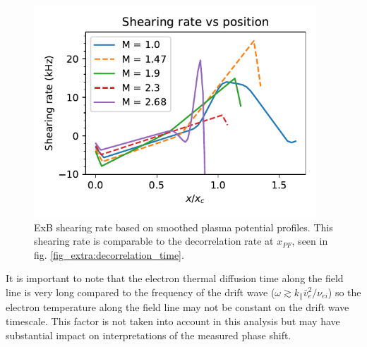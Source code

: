 \begin{figure}
    \centering
    \includegraphics[width=300pt]{figures/extra/ExB_shearing-rate_zoomed.pdf}
    \caption[ExB shearing rate]{ExB shearing rate based on smoothed plasma potential profiles. This shearing rate is comparable to the decorrelation rate at $x_{PF}$, seen in fig. \ref{fig_extra:decorrelation_time}.}
    \label{fig_extra:ExB_shearing-rate}
\end{figure}


It is important to note that the electron thermal diffusion time along the field line is very long compared to the frequency of the drift wave ($\omega \gtrsim k_\parallel \bar{v}_e^2 / \nu_{ei}$) \cite{Goldston_textbook} so the electron temperature along the field line may not be constant on the drift wave timescale. This factor is not taken into account in this analysis but may have substantial impact on interpretations of the measured phase shift.

